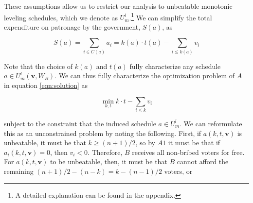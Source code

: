 \documentclass[12pt,a4paper]{article}
\newcommand{\real}{\mathbb{R}_+^n}
\begin{document}

These assumptions allow us to restrict our analysis to unbeatable monotonic leveling schedules, which we denote as $U_m^l$.\footnote{A detailed explanation can be found in the appendix.} We can simplify the total expenditure on patronage by the government, $S(a)$, as

\begin{equation*}
    S(a) = \sum_{i \in C(a)}a_i = k(a) \cdot t(a) - \sum_{i \leq k(a)}v_i
\end{equation*}

Note that the choice of $k(a)$ and $t(a)$ fully characterize any schedule $a \in U_m^l(\mathbf{v}, W_B)$. We can thus fully characterize the optimization problem of $A$ in equation \ref{eqn:solution} as

\begin{equation*}
    \min_{k,t} k \cdot t- \sum_{i \leq k} v_i
\end{equation*}

subject to the constraint that the induced schedule $a \in U_m^l$. We can reformulate this as an unconstrained problem by noting the following. First, if $a(k, t, \mathbf{v})$ is unbeatable, it must be that $k \geq (n + 1)/2$, so by $A1$ it must be that if $a_i(k, t, \mathbf{v}) = 0$, then $v_i < 0$. Therefore, $B$ receives all non-bribed voters for free. For $a(k, t, \mathbf{v})$ to be unbeatable, then, it must be that $B$ cannot afford the remaining $(n + 1)/2 - (n - k) = k - (n - 1)/2$ voters, or
\end{document}
